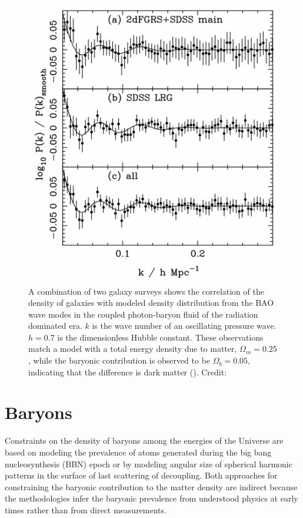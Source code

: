 \documentclass{paper}
\begin{document}
  \begin{figure}[H]
    \begin{centering}
    \includegraphics[scale=0.5]{DM-BAO.pdf}
    \caption{A combination of two galaxy surveys shows the correlation of
      the density of galaxies with modeled density distribution from the
      BAO wave modes in the coupled photon-baryon
      fluid of the radiation dominated era. $k$ is the wave number of 
      an oscillating pressure wave. \(h = 0.7\) is the dimensionless Hubble
      constant. These observations match a model with a total energy density
      due to matter, \(\Omega_m = 0.25\), while the baryonic contribution is
      observed to be \(\Omega_b = 0.05\), indicating that the 
      difference is dark matter (\cite{Eisenstein_2005}).
    Credit: \cite{2007MNRAS.381.1053P}}
    \label{fig:DM-BAO}
    \end{centering}
  \end{figure}

\section*{Baryons}
  Constraints on the density of baryons among the energies of the Universe are
  based on modeling the prevalence of atoms generated during the big bang 
  nucleosynthesis (BBN) epoch or by modeling angular size of spherical 
  harmonic patterns in the surface of last scattering of decoupling. Both 
  approaches for constraining the baryonic contribution to the matter density 
  are indirect because the methodologies infer the baryonic prevalence from 
  understood physics at early times rather than from direct measurements.
\end{document}
